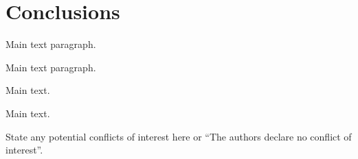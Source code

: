 \section{Conclusions}


Main text paragraph.


Main text paragraph.


Main text.


Main text.


State any potential conflicts of interest here or ``The authors declare no conflict of interest''. 
